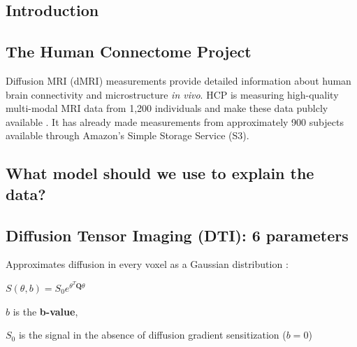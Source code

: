 \documentclass[a0, landscape]{a0poster}
\begin{document}
\begin{multicols}{3} %


\section*{Introduction}

\subsection*{The Human Connectome Project}

Diffusion MRI (dMRI) measurements provide detailed information about human brain
connectivity and microstructure \emph{in vivo}. HCP is measuring high-quality
multi-modal MRI data from 1,200 individuals and make these data publcly
available \cite{VanEssen2012}. It has already made measurements from
approximately 900 subjects available through Amazon's Simple Storage Service
(S3).

\subsection*{What model should we use to explain the data?}

\subsection*{Diffusion Tensor Imaging (DTI): 6 parameters}

Approximates diffusion in every voxel as a Gaussian distribution
\cite{Basser1994-hg}:

\vspace{2mm}
\begin{center}
\begin{large}

$S(\theta, b) = S_0 e^{\theta^T \mathbf{Q} \theta} $

\end{large}
\end{center}

\noindent $b$ is the \textbf {b-value},

\noindent $S_0$ is the signal in the absence of diffusion gradient sensitization ($b=0$)


\end{multicols}
\end{document}
